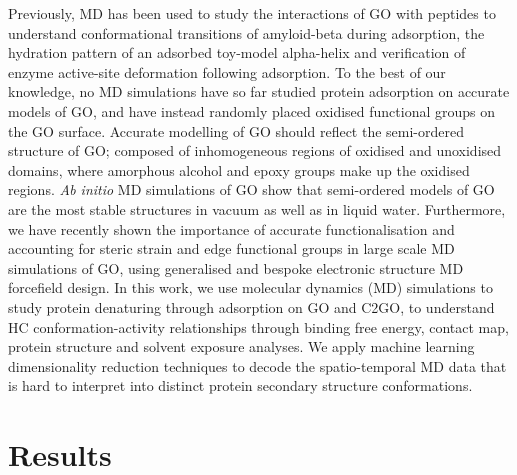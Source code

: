  Previously, MD has been used to study the interactions of GO with peptides to understand conformational transitions of amyloid-beta during adsorption,\cite{baweja_effect_2015} the hydration pattern of an adsorbed toy-model alpha-helix \cite{baweja2013hydration} and verification of enzyme active-site deformation following adsorption. \cite{sun_mechanism_2014} To the best of our knowledge, no MD simulations have so far studied protein adsorption on accurate models of GO, and have instead randomly placed oxidised functional groups on the GO surface. Accurate modelling of GO should reflect the semi-ordered structure of GO; composed of inhomogeneous regions of oxidised and unoxidised domains, where amorphous alcohol and epoxy groups make up the oxidised regions.\cite{sinclair2019modelling} \textit{Ab initio} MD simulations of GO show that semi-ordered models of GO are the most stable structures in vacuum as well as in liquid water.\cite{mouhat2020structure} Furthermore, we have recently shown the importance of accurate functionalisation and accounting for steric strain and edge functional groups in large scale MD simulations of GO, using generalised and bespoke electronic structure MD forcefield design.\cite{al2020accurate} In this work, we use molecular dynamics (MD) simulations to study protein denaturing through adsorption on GO and C2GO, to understand HC conformation-activity relationships through binding free energy, contact map, protein structure and solvent exposure analyses. We apply machine learning dimensionality reduction techniques to decode the spatio-temporal MD data that is hard to interpret into distinct protein secondary structure conformations.
%
%
\section{Results}
%
